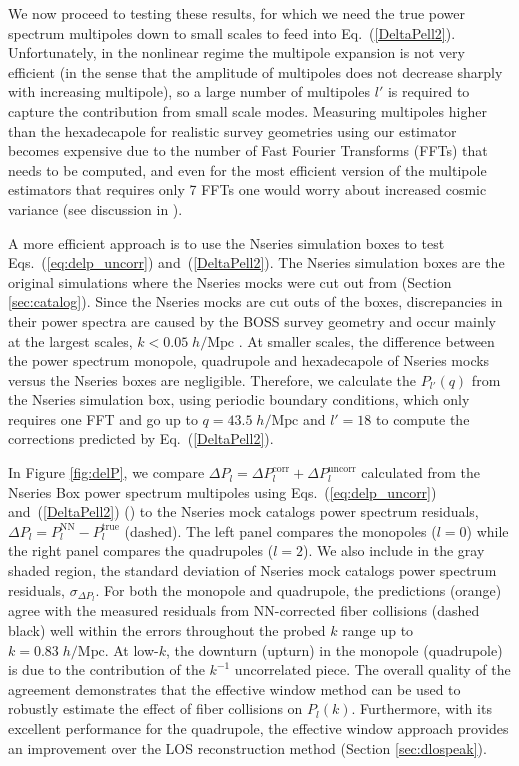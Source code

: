 We now proceed to testing these results, for which we need the true power spectrum multipoles down to small scales to feed into Eq.~(\ref{DeltaPell2}). Unfortunately, in the nonlinear regime the multipole expansion is not very efficient (in the sense that the amplitude of multipoles does not decrease sharply with increasing multipole), so a large number of multipoles $l'$ is required to capture the contribution from small scale modes.  Measuring multipoles higher than the hexadecapole for realistic survey geometries  using our estimator becomes expensive due to the number of 
Fast Fourier Transforms (FFTs) that needs to be computed, and even for the most efficient version of the multipole estimators that requires only 7 FFTs one would worry about increased cosmic variance (see discussion in \citealt{Scoccimarro:2015aa}). 

A more efficient approach is to use the Nseries simulation boxes to test Eqs.~(\ref{eq:delp_uncorr}) and~(\ref{DeltaPell2}). The Nseries simulation boxes are the 
original simulations where the Nseries mocks were 
cut out from (Section \ref{sec:catalog}). Since the Nseries mocks 
are cut outs of the boxes, 
discrepancies in their power spectra are caused by the BOSS survey 
geometry and occur mainly at the largest scales, $k < 0.05\;h/\mathrm{Mpc}$ \citep{Beutler:2014aa,Grieb:2016aa}. 
At smaller scales, the difference between the power spectrum monopole, 
quadrupole and hexadecapole of Nseries mocks versus the Nseries boxes are 
negligible. 
Therefore, we calculate the $P_{l'}(q)$ from the Nseries simulation box, 
using periodic boundary conditions, which only requires one FFT and go up to $q = 43.5\;h/\mathrm{Mpc}$ and $l'=18$ to compute the corrections predicted by  Eq.~(\ref{DeltaPell2}).  

In Figure \ref{fig:delP}, we compare $\Delta P_l = \Delta P_l^\mathrm{corr} + 
\Delta P_l^\mathrm{uncorr}$ calculated from the Nseries Box power spectrum multipoles using Eqs.~(\ref{eq:delp_uncorr}) and~(\ref{DeltaPell2}) (\nseriescolor) to the Nseries mock catalogs power spectrum residuals, $\Delta P_l = P_l^\mathrm{NN} - P_l^\mathrm{true}$ (dashed). 
The left panel compares the monopoles ($l = 0$) while the right panel compares 
the quadrupoles ($l=2$). We also include in the gray shaded 
region, the standard deviation of Nseries mock catalogs power spectrum residuals,
$\sigma_{\Delta P_l}$. For both the monopole and quadrupole, the predictions (orange) agree with the measured residuals from NN-corrected fiber collisions (dashed black) well within the errors throughout the probed $k$ range up to $k=0.83\;h/\mathrm{Mpc}$. At low-$k$, the downturn (upturn) in the monopole (quadrupole) is due to the contribution of the $k^{-1}$ uncorrelated piece. 
The overall quality of the  agreement demonstrates that the effective window method can be used to robustly 
estimate the effect of fiber collisions on $P_l(k)$. Furthermore, with its
excellent performance for the quadrupole, the effective window approach 
provides an improvement over the LOS reconstruction method (Section
\ref{sec:dlospeak}). 

